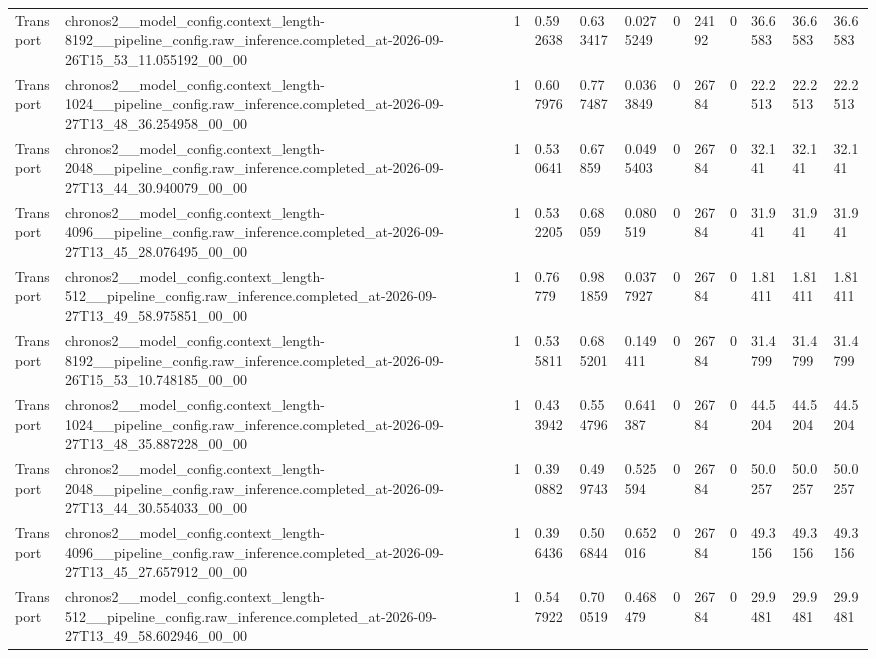 \begin{tabular}{llllllllllll}
Transport & chronos2\_\_model\_config.context\_length-8192\_\_pipeline\_config.raw\_inference.completed\_at-2026-09-26T15\_53\_11.055192\_00\_00 & 1 & 0.592638 & 0.633417 & 0.0275249 & 0 & 24192 & 0 & 36.6583 & 36.6583 & 36.6583 \\
Transport & chronos2\_\_model\_config.context\_length-1024\_\_pipeline\_config.raw\_inference.completed\_at-2026-09-27T13\_48\_36.254958\_00\_00 & 1 & 0.607976 & 0.777487 & 0.0363849 & 0 & 26784 & 0 & 22.2513 & 22.2513 & 22.2513 \\
Transport & chronos2\_\_model\_config.context\_length-2048\_\_pipeline\_config.raw\_inference.completed\_at-2026-09-27T13\_44\_30.940079\_00\_00 & 1 & 0.530641 & 0.67859 & 0.0495403 & 0 & 26784 & 0 & 32.141 & 32.141 & 32.141 \\
Transport & chronos2\_\_model\_config.context\_length-4096\_\_pipeline\_config.raw\_inference.completed\_at-2026-09-27T13\_45\_28.076495\_00\_00 & 1 & 0.532205 & 0.68059 & 0.080519 & 0 & 26784 & 0 & 31.941 & 31.941 & 31.941 \\
Transport & chronos2\_\_model\_config.context\_length-512\_\_pipeline\_config.raw\_inference.completed\_at-2026-09-27T13\_49\_58.975851\_00\_00 & 1 & 0.76779 & 0.981859 & 0.0377927 & 0 & 26784 & 0 & 1.81411 & 1.81411 & 1.81411 \\
Transport & chronos2\_\_model\_config.context\_length-8192\_\_pipeline\_config.raw\_inference.completed\_at-2026-09-26T15\_53\_10.748185\_00\_00 & 1 & 0.535811 & 0.685201 & 0.149411 & 0 & 26784 & 0 & 31.4799 & 31.4799 & 31.4799 \\
Transport & chronos2\_\_model\_config.context\_length-1024\_\_pipeline\_config.raw\_inference.completed\_at-2026-09-27T13\_48\_35.887228\_00\_00 & 1 & 0.433942 & 0.554796 & 0.641387 & 0 & 26784 & 0 & 44.5204 & 44.5204 & 44.5204 \\
Transport & chronos2\_\_model\_config.context\_length-2048\_\_pipeline\_config.raw\_inference.completed\_at-2026-09-27T13\_44\_30.554033\_00\_00 & 1 & 0.390882 & 0.499743 & 0.525594 & 0 & 26784 & 0 & 50.0257 & 50.0257 & 50.0257 \\
Transport & chronos2\_\_model\_config.context\_length-4096\_\_pipeline\_config.raw\_inference.completed\_at-2026-09-27T13\_45\_27.657912\_00\_00 & 1 & 0.396436 & 0.506844 & 0.652016 & 0 & 26784 & 0 & 49.3156 & 49.3156 & 49.3156 \\
Transport & chronos2\_\_model\_config.context\_length-512\_\_pipeline\_config.raw\_inference.completed\_at-2026-09-27T13\_49\_58.602946\_00\_00 & 1 & 0.547922 & 0.700519 & 0.468479 & 0 & 26784 & 0 & 29.9481 & 29.9481 & 29.9481 \\

\end{tabular}
